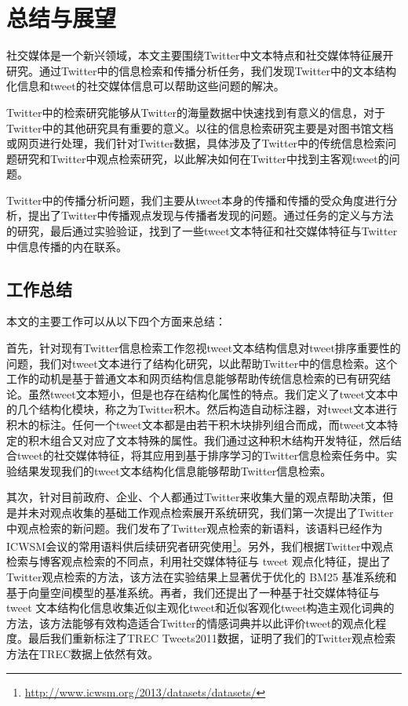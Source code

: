 \chapter{总结与展望}
\label{con}
社交媒体是一个新兴领域，本文主要围绕Twitter中文本特点和社交媒体特征展开研究。通过Twitter中的信息检索和传播分析任务，我们发现Twitter中的文本结构化信息和tweet的社交媒体信息可以帮助这些问题的解决。

Twitter中的检索研究能够从Twitter的海量数据中快速找到有意义的信息，对于Twitter中的其他研究具有重要的意义。以往的信息检索研究主要是对图书馆文档或网页进行处理，我们针对Twitter数据，具体涉及了Twitter中的传统信息检索问题研究和Twitter中观点检索研究，以此解决如何在Twitter中找到主客观tweet的问题。

Twitter中的传播分析问题，我们主要从tweet本身的传播和传播的受众角度进行分析，提出了Twitter中传播观点发现与传播者发现的问题。通过任务的定义与方法的研究，最后通过实验验证，找到了一些tweet文本特征和社交媒体特征与Twitter中信息传播的内在联系。

\section{工作总结}

本文的主要工作可以从以下四个方面来总结：

首先，针对现有Twitter信息检索工作忽视tweet文本结构信息对tweet排序重要性的问题，我们对tweet文本进行了结构化研究，以此帮助Twitter中的信息检索。这个工作的动机是基于普通文本和网页结构信息能够帮助传统信息检索的已有研究结论。虽然tweet文本短小，但是也存在结构化属性的特点。我们定义了tweet文本中的几个结构化模块，称之为Twitter积木。然后构造自动标注器，对tweet文本进行积木的标注。任何一个tweet文本都是由若干积木块排列组合而成，而tweet文本特定的积木组合又对应了文本特殊的属性。我们通过这种积木结构开发特征，然后结合tweet的社交媒体特征，将其应用到基于排序学习的Twitter信息检索任务中。实验结果发现我们的tweet文本结构化信息能够帮助Twitter信息检索。

其次，针对目前政府、企业、个人都通过Twitter来收集大量的观点帮助决策，但是并未对观点收集的基础工作观点检索展开系统研究，我们第一次提出了Twitter中观点检索的新问题。我们发布了Twitter观点检索的新语料，该语料已经作为ICWSM会议的常用语料供后续研究者研究使用\footnote{\url{http://www.icwsm.org/2013/datasets/datasets/}}。另外，我们根据Twitter中观点检索与博客观点检索的不同点，利用社交媒体特征与 tweet 观点化特征，提出了Twitter观点检索的方法，该方法在实验结果上显著优于优化的 BM25 基准系统和基于向量空间模型的基准系统。再者，我们还提出了一种基于社交媒体特征与 tweet 文本结构化信息收集近似主观化tweet和近似客观化tweet构造主观化词典的方法，该方法能够有效构造适合Twitter的情感词典并以此评价tweet的观点化程度。最后我们重新标注了TREC Tweets2011数据，证明了我们的Twitter观点检索方法在TREC数据上依然有效。

